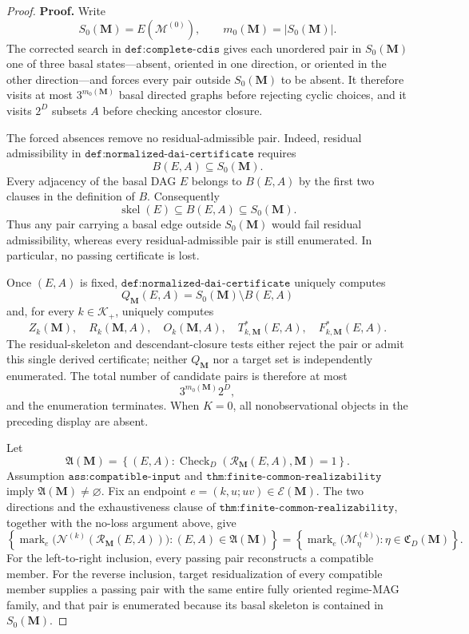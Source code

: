 \documentclass{article}
\begin{document}
\begin{proof}
\textbf{Proof.}
Write
\[
S_0(\mathbf M)=E(\mathcal M^{(0)}),
\qquad
m_0(\mathbf M)=|S_0(\mathbf M)|.
\]
The corrected search in \(\texttt{def:complete-cdis}\) gives each unordered pair in \(S_0(\mathbf M)\) one of three basal states---absent, oriented in one direction, or oriented in the other direction---and forces every pair outside \(S_0(\mathbf M)\) to be absent.  It therefore visits at most \(3^{m_0(\mathbf M)}\) basal directed graphs before rejecting cyclic choices, and it visits \(2^D\) subsets \(A\) before checking ancestor closure.

The forced absences remove no residual-admissible pair.  Indeed, residual admissibility in \(\texttt{def:normalized-dai-certificate}\) requires
\[
B(E,A)\subseteq S_0(\mathbf M).
\]
Every adjacency of the basal DAG \(E\) belongs to \(B(E,A)\) by the first two clauses in the definition of \(B\).  Consequently
\[
\operatorname{skel}(E)\subseteq B(E,A)\subseteq S_0(\mathbf M).
\]
Thus any pair carrying a basal edge outside \(S_0(\mathbf M)\) would fail residual admissibility, whereas every residual-admissible pair is still enumerated.  In particular, no passing certificate is lost.

Once \((E,A)\) is fixed, \(\texttt{def:normalized-dai-certificate}\) uniquely computes
\[
Q_{\mathbf M}(E,A)=S_0(\mathbf M)\setminus B(E,A)
\]
and, for every \(k\in\mathcal K_+\), uniquely computes
\[
Z_k(\mathbf M),\quad R_k(\mathbf M,A),\quad O_k(\mathbf M,A),
\quad T^*_{k,\mathbf M}(E,A),\quad F^*_{k,\mathbf M}(E,A).
\]
The residual-skeleton and descendant-closure tests either reject the pair or admit this single derived certificate; neither \(Q_{\mathbf M}\) nor a target set is independently enumerated.  The total number of candidate pairs is therefore at most
\[
3^{m_0(\mathbf M)}2^D,
\]
and the enumeration terminates.  When \(K=0\), all nonobservational objects in the preceding display are absent.

Let
\[
\mathfrak A(\mathbf M)=
\left\{(E,A):
\operatorname{Check}_{D}(\mathcal R_{\mathbf M}(E,A),\mathbf M)=1
\right\}.
\]
Assumption \(\texttt{ass:compatible-input}\) and \(\texttt{thm:finite-common-realizability}\) imply \(\mathfrak A(\mathbf M)\ne\varnothing\).  Fix an endpoint \(e=(k,u;uv)\in\mathcal E(\mathbf M)\).  The two directions and the exhaustiveness clause of \(\texttt{thm:finite-common-realizability}\), together with the no-loss argument above, give
\[
\left\{
\operatorname{mark}_e\bigl(\mathcal N^{(k)}(\mathcal R_{\mathbf M}(E,A))\bigr):
(E,A)\in\mathfrak A(\mathbf M)
\right\}
=
\left\{
\operatorname{mark}_e\bigl(\mathcal M_\eta^{(k)}\bigr):
\eta\in\mathfrak C_D(\mathbf M)
\right\}.
\]
For the left-to-right inclusion, every passing pair reconstructs a compatible member.  For the reverse inclusion, target residualization of every compatible member supplies a passing pair with the same entire fully oriented regime-MAG family, and that pair is enumerated because its basal skeleton is contained in \(S_0(\mathbf M)\).


\end{proof}
\end{document}
